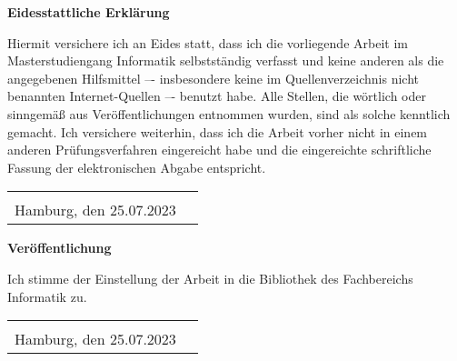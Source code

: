 
\thispagestyle{empty}
\pagestyle{empty}

\begin{center}
	\Large
	\textbf{Eidesstattliche Erklärung}
\end{center}
\noindent
Hiermit versichere ich an Eides statt, dass ich die vorliegende Arbeit im Masterstudiengang Informatik selbstständig verfasst und keine anderen als die angegebenen Hilfsmittel –- insbesondere keine im Quellenverzeichnis nicht benannten Internet-Quellen –- benutzt habe. Alle Stellen, die wörtlich oder sinngemäß aus Veröffentlichungen entnommen wurden, sind als solche kenntlich gemacht. Ich versichere weiterhin, dass ich die Arbeit vorher nicht in einem anderen Prüfungsverfahren eingereicht habe und die eingereichte schriftliche Fassung der elektronischen Abgabe entspricht.

\vspace*{1cm}
\noindent
\begin{tabularx}{\textwidth}{@{}Xr@{}}
	&
	\begin{tabular}{@{}l@{}}
		\makebox[5cm]{}\\ %
		\hline
	\end{tabular}
	\\
	\noindent
	Hamburg, den 25.07.2023
	&
	\makebox[5cm]{Hauke Stieler}
\end{tabularx}

\vspace*{3cm}

\begin{center}
	\Large
	\textbf{Veröffentlichung}
\end{center}
\noindent
Ich stimme der Einstellung der Arbeit in die Bibliothek des Fachbereichs Informatik zu.

\vspace*{1cm}
\noindent
\begin{tabularx}{\textwidth}{@{}Xr@{}}
	&
	\begin{tabular}{@{}l@{}}
		\makebox[5cm]{}\\ %
		\hline
	\end{tabular}
	\\
	\noindent
	Hamburg, den 25.07.2023
	&
	\makebox[5cm]{Hauke Stieler}
\end{tabularx}